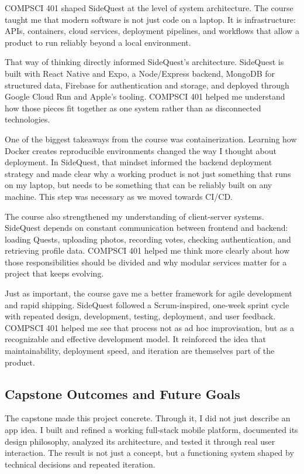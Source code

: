 \documentclass[12pt,a4paper,oneside]{report}
\begin{document}
COMPSCI 401 shaped SideQuest at the level of system architecture. The course taught me that modern software is not just code on a laptop. It is infrastructure: APIs, containers, cloud services, deployment pipelines, and workflows that allow a product to run reliably beyond a local environment.

That way of thinking directly informed SideQuest’s architecture. SideQuest is built with React Native and Expo, a Node/Express backend, MongoDB for structured data, Firebase for authentication and storage, and deployed through Google Cloud Run and Apple’s tooling. COMPSCI 401 helped me understand how those pieces fit together as one system rather than as disconnected technologies.

One of the biggest takeaways from the course was containerization. Learning how Docker creates reproducible environments changed the way I thought about deployment. In SideQuest, that mindset informed the backend deployment strategy and made clear why a working product is not just something that runs on my laptop, but needs to be something that can be reliably built on any machine. This step was necessary as we moved towards CI/CD.

The course also strengthened my understanding of client-server systems. SideQuest depends on constant communication between frontend and backend: loading Quests, uploading photos, recording votes, checking authentication, and retrieving profile data. COMPSCI 401 helped me think more clearly about how those responsibilities should be divided and why modular services matter for a project that keeps evolving.

Just as important, the course gave me a better framework for agile development and rapid shipping. SideQuest followed a Scrum-inspired, one-week sprint cycle with repeated design, development, testing, deployment, and user feedback. COMPSCI 401 helped me see that process not as ad hoc improvisation, but as a recognizable and effective development model. It reinforced the idea that maintainability, deployment speed, and iteration are themselves part of the product.

\subsection*{Capstone Outcomes and Future Goals}

The capstone made this project concrete. Through it, I did not just describe an app idea. I built and refined a working full-stack mobile platform, documented its design philosophy, analyzed its architecture, and tested it through real user interaction. The result is not just a concept, but a functioning system shaped by technical decisions and repeated iteration.
\end{document}
